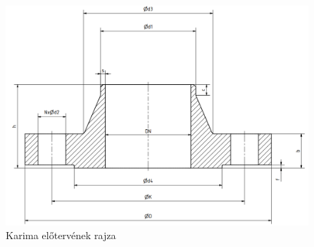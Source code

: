 \newpage
\begin{figure}[hbt!]
	\centering
	\includegraphics[scale=.53]{./images/karima.png}
	\caption{Karima előtervének rajza}
\end{figure}

